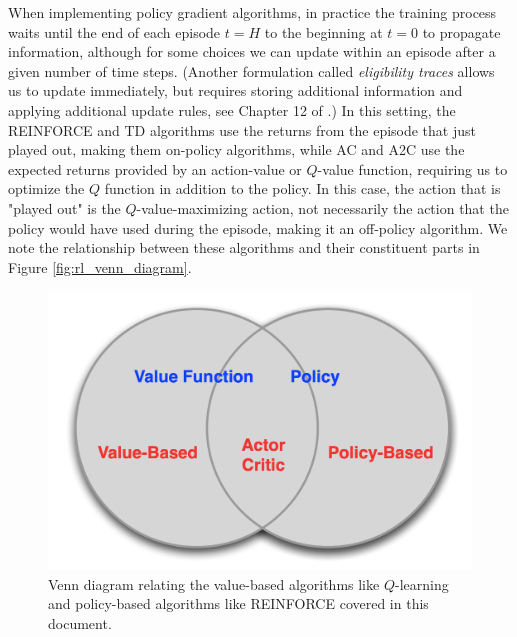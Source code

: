 \documentclass{article}
\begin{document}
When implementing policy gradient algorithms, in practice the training process waits until the end of each episode $t=H$ to the beginning at $t=0$ to propagate information, although for some choices we can update within an episode after a given number of time steps. (Another formulation called \textit{eligibility traces} allows us to update immediately, but requires storing additional information and applying additional update rules, see Chapter 12 of \cite{sutton_barto_rl}.) In this setting, the REINFORCE and TD algorithms use the returns from the episode that just played out, making them on-policy algorithms, while AC and A2C use the expected returns provided by an action-value or $Q$-value function, requiring us to optimize the $Q$ function in addition to the policy. In this case, the action that is "played out" is the $Q$-value-maximizing action, not necessarily the action that the policy would have used during the episode, making it an off-policy algorithm.  We note the relationship between these algorithms and their constituent parts in Figure \ref{fig:rl_venn_diagram}.

\begin{figure}
\label{fig:rl_venn_diagram}
    \begin{center}
    \includegraphics[width=0.75\linewidth]{rl_venn_diagram}
    \caption{Venn diagram relating the value-based algorithms like $Q$-learning and policy-based algorithms like REINFORCE covered in this document. \footnotemark}
    \label{fig:basis_small_width}
    \end{center}
\end{figure}
\end{document}
